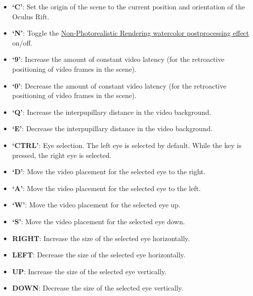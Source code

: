 \begin{itemize}
\itemsep1pt\parskip0pt
\item
  \textbf{`C'}: Set the origin of the scene to the current position and
  orientation of the Oculus Rift.
\item
  \textbf{`N'}: Toggle the
  \hyperref[sec:postprocessing]{Non-Photorealistic
  Rendering watercolor postprocessing effect} on/off.
\item
  \textbf{`9'}: Increase the amount of constant video latency (for the
  retroactive positioning of video frames in the scene).
\item
  \textbf{`0'}: Decrease the amount of constant video latency (for the
  retroactive positioning of video frames in the scene).
\item
  \textbf{`Q'}: Increase the interpupillary distance in the video
  background.
\item
  \textbf{`E'}: Decrease the interpupillary distance in the video
  background.
\item
  \textbf{`CTRL'}: Eye selection. The left eye is selected by default.
  While the key is pressed, the right eye is selected.
\item
  \textbf{`D'}: Move the video placement for the selected eye to the
  right.
\item
  \textbf{`A'}: Move the video placement for the selected eye to the
  left.
\item
  \textbf{`W'}: Move the video placement for the selected eye up.
\item
  \textbf{`S'}: Move the video placement for the selected eye down.
\item
  \textbf{RIGHT}: Increase the size of the selected eye horizontally.
\item
  \textbf{LEFT}: Decrease the size of the selected eye horizontally.
\item
  \textbf{UP}: Increase the size of the selected eye vertically.
\item
  \textbf{DOWN}: Decrease the size of the selected eye vertically.
\end{itemize}
